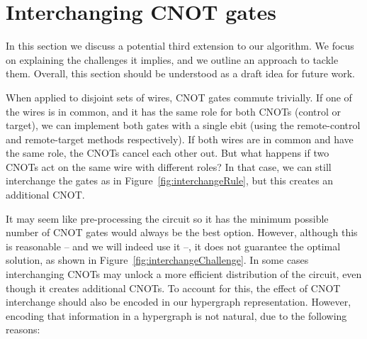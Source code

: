 

\section{Interchanging CNOT gates}
\label{Interchange}

In this section we discuss a potential third extension to our algorithm. We focus on explaining the challenges it implies, and we outline an approach to tackle them. Overall, this section should be understood as a draft idea for future work. 

When applied to disjoint sets of wires, CNOT gates commute trivially. If one of the wires is in common, and it has the same role for both CNOTs (control or target), we can implement both gates with a single ebit (using the remote-control and remote-target methods respectively). If both wires are in common and have the same role, the CNOTs cancel each other out. But what happens if two CNOTs act on the same wire with different roles? In that case, we can still interchange the gates as in Figure~\ref{fig:interchangeRule}, but this creates an additional CNOT.





It may seem like pre-processing the circuit so it has the minimum possible number of CNOT gates would always be the best option. However, although this is reasonable -- and we will indeed use it --, it does not guarantee the optimal solution, as shown in Figure~\ref{fig:interchangeChallenge}. In some cases interchanging CNOTs may unlock a more efficient distribution of the circuit, even though it creates additional CNOTs. To account for this, the effect of CNOT interchange should also be encoded in our hypergraph representation. However, encoding that information in a hypergraph is not natural, due to the following reasons:

